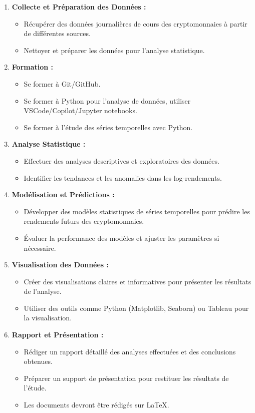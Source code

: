 \documentclass[a4paper,12pt]{article}
\begin{document}
\begin{enumerate}
    \item \textbf{Collecte et Préparation des Données :}
    \begin{itemize}
        \item Récupérer des données journalières de cours des cryptomonnaies à partir de différentes sources.
        \item Nettoyer et préparer les données pour l'analyse statistique.
    \end{itemize}
    \item \textbf{Formation :}
    \begin{itemize}
        \item Se former à Git/GitHub.
        \item Se former à Python pour l'analyse de données, utiliser VSCode/Copilot/Jupyter notebooks.
        \item Se former à l'étude des séries temporelles avec Python.
    \end{itemize}

    \item \textbf{Analyse Statistique :}
    \begin{itemize}
        \item Effectuer des analyses descriptives et exploratoires des données.
        \item Identifier les tendances et les anomalies dans les log-rendements.
    \end{itemize}

    \item \textbf{Modélisation et Prédictions :}
    \begin{itemize}
        \item Développer des modèles statistiques de séries temporelles pour prédire les rendements futurs des cryptomonnaies.
        \item Évaluer la performance des modèles et ajuster les paramètres si nécessaire.
    \end{itemize}

    \item \textbf{Visualisation des Données :}
    \begin{itemize}
        \item Créer des visualisations claires et informatives pour présenter les résultats de l'analyse.
        \item Utiliser des outils comme Python (Matplotlib, Seaborn) ou Tableau pour la visualisation.
    \end{itemize}

    \item \textbf{Rapport et Présentation :}
    \begin{itemize}
        \item Rédiger un rapport détaillé des analyses effectuées et des conclusions obtenues.
        \item Préparer un support de présentation pour restituer les résultats de l'étude.
        \item Les documents devront être rédigés sur LaTeX.
    \end{itemize}
\end{enumerate}
\end{document}
